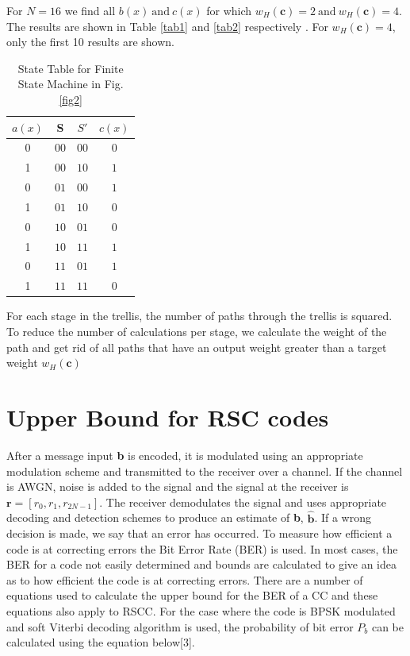 \documentclass[conference]{IEEEtran}
\begin{document}
 For $N=16$ we find all $b(x) ~\text{and}~ c(x)$ for which $w_H(\textbf{c})=2 ~\text{and} ~ w_H(\textbf{c})=4$. The results are shown in Table \ref{tab1} and \ref{tab2} respectively . For $w_H(\textbf{c})=4$, only the first 10 results are shown.  
 
   \begin{table}[h!]
 
 \caption{State Table for Finite State Machine in Fig. \ref{fig2}}
\centering
 \begin{tabular}{c c c c} 
 \hline
 $a(x)$ & S & $S'$ & $c(x)$ \\ [0.5ex] 
 \hline\hline
 0 & $0 0 $& $0 0$ & $0$\\ 
  1& $0 0$ & $1 0$ & $1$ \\
  0 & $0 1$& $0 0$ & $1$ \\
  1& $0 1$& $1 0$& $0$ \\
  0& $1 0$ & $0 1$ & $0$ \\
 1 & $1 0 $ & $1 1$ & $1$\\ 
 0 & $1 1$ & $0 1$ & $1$ \\ 
 1 & $1 1$ & $1 1$ & $0$ \\ [1ex] 
 \hline
 \end{tabular}
 \label{tab3}
\end{table}
 
  For each stage in the trellis, the number of paths through the trellis is squared. To reduce the number of calculations per stage, we calculate the weight of the path and get rid of all paths that have an output weight greater than a target weight $w_H(\textbf{c})$
 
\section{Upper Bound for RSC codes}
\label{sec4}
After a message input \textbf{b} is encoded, it is modulated using an appropriate modulation scheme and transmitted to the receiver over a channel. If the channel is AWGN, noise is added to the signal and the signal at the receiver is $\textbf{r}=[r_0,r_1,r_{2N-1}]$. The receiver demodulates the signal and uses appropriate decoding and detection schemes to produce an estimate of \textbf{b}, $\hat{ \textbf{b} }$. If a wrong decision is made, we say that an error has occurred. To measure how efficient a code is at correcting errors the Bit Error Rate (BER) is used. In most cases, the BER for a code not easily determined and bounds are calculated to give an idea as to how efficient the code is at correcting errors. There are a number of equations used to calculate the upper bound for the BER of a CC and these equations also apply to RSCC. For the case where the code is BPSK modulated and soft Viterbi decoding algorithm is used, the probability of bit error $P_b$ can be calculated using the equation below[3].
\end{document}
